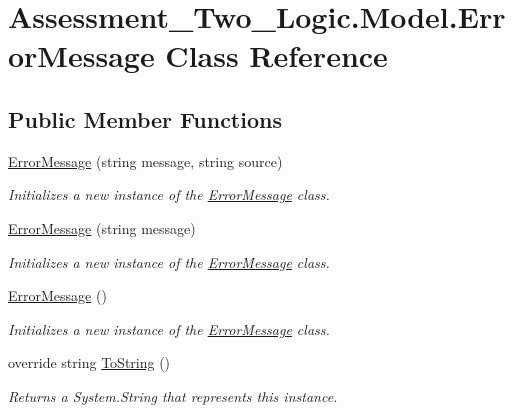 \hypertarget{class_assessment___two___logic_1_1_model_1_1_error_message}{
\section{Assessment\_\-Two\_\-Logic.Model.ErrorMessage Class Reference}
\label{class_assessment___two___logic_1_1_model_1_1_error_message}
}
\subsection*{Public Member Functions}
\begin{DoxyCompactItemize}
\item 
\hyperlink{class_assessment___two___logic_1_1_model_1_1_error_message_ad056ac5ce0098119bf6e62d65667102d}{ErrorMessage} (string message, string source)
\begin{DoxyCompactList}\small\item\em Initializes a new instance of the \hyperlink{class_assessment___two___logic_1_1_model_1_1_error_message}{ErrorMessage} class. \item\end{DoxyCompactList}\item 
\hyperlink{class_assessment___two___logic_1_1_model_1_1_error_message_a510cc0d26b03384567191f5ec88c6e23}{ErrorMessage} (string message)
\begin{DoxyCompactList}\small\item\em Initializes a new instance of the \hyperlink{class_assessment___two___logic_1_1_model_1_1_error_message}{ErrorMessage} class. \item\end{DoxyCompactList}\item 
\hyperlink{class_assessment___two___logic_1_1_model_1_1_error_message_a26f7292e2d2274b13fd1d9dcdb80eb36}{ErrorMessage} ()
\begin{DoxyCompactList}\small\item\em Initializes a new instance of the \hyperlink{class_assessment___two___logic_1_1_model_1_1_error_message}{ErrorMessage} class. \item\end{DoxyCompactList}\item 
override string \hyperlink{class_assessment___two___logic_1_1_model_1_1_error_message_ab131349695c6dc5f509ed866d125156f}{ToString} ()
\begin{DoxyCompactList}\small\item\em Returns a System.String that represents this instance. \item\end{DoxyCompactList}\end{DoxyCompactItemize}
